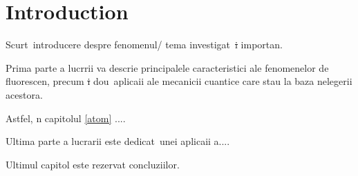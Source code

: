 \chapter{Introduction}
\label{intro}

\indent

\par


 
Scurt\ab\  introducere despre fenomenul/ tema investigat\ab\ \st i importan\tb \ab.
 
		 
		 
		Prima parte a lucr\ab rii va descrie principalele caracteristici ale fenomenelor de fluorescen\tb \ab, precum \st i dou\ab \ aplica\tb ii              ale mecanicii cuantice care stau la baza \ib n\tb elegerii acestora.
		
 		 Astfel, \ib n capitolul \ref{atom} ....
 		 
 		 
  		Ultima parte a lucrarii este dedicat\ab \ unei aplica\tb ii a....
  		
	Ultimul capitol este rezervat concluziilor.
  
  
  